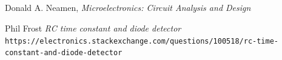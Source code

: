 \documentclass[12pt, a4paper]{article}
\begin{document}
	\subsection{}



\begin{thebibliography}{9}

	  Donald A. Neamen,
	  \textit{Microelectronics: Circuit Analysis and Design}

	Phil Frost
	\textit{RC time constant and diode detector}
	\texttt{https://electronics.stackexchange.com/questions/100518/rc-time-constant-and-diode-detector}

\end{thebibliography}
\end{document}
